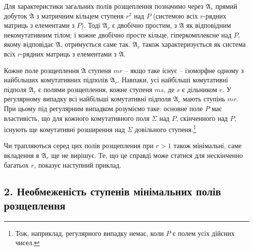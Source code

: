 \documentclass[11pt]{article}
\newcommand{\mA}{\mathfrak{A}}
\begin{document}
\noindent Для характеристики загальних полів розщеплення позначимо через $\mA_r$ прямий добуток $\mA$ з матричним кільцем ступеня $r^2$ над $P$ (системою всіх $r$-рядних матриць з елементами з $P$). Тоді $\mA_r$ є двобічно простим, з $\mA$ як відповідним некомутативним тілом; і кожне двобічно просте кільце, гіперкомплексне над $P$, якому відповідає $\mA$, отримується саме так. $\mA_r$ також характеризується як система всіх $r$-рядних матриць з елементами з $\mA$.

\medskip

\noindent Кожне поле розщеплення $\mA$ ступеня $mr$ -- якщо таке існує -- ізоморфне одному з найбільших комутативних підполів $\mA_r$. Навпаки, усі найбільші комутативні підполя $\mA_r$ є полями розщеплення, кожне ступеня $ms$, де $s$ є дільником $r$. У регулярному випадку всі найбільші комутативні підполя $\mA_r$ мають ступінь $mr$. При цьому під регулярним випадком розуміємо таке: основне поле $P$ має властивість, що для кожного комутативного поля $\Sigma$ над $P$, скінченного над $P$, існують ще комутативні розширення над $\Sigma$ довільного ступеня.\footnote{Тож, наприклад, регулярного випадку немає, коли $P$ є полем усіх дійсних чисел.}

\medskip

\noindent Чи трапляються серед цих полів розщеплення при $r>1$ також мінімальні, саме вкладення в $\mA_r$ ще не вирішує. Те, що це справді може статися для нескінченно багатьох $r$, показує наступний приклад.

\subsection*{2. Необмеженість ступенів мінімальних полів розщеплення}
\end{document}
